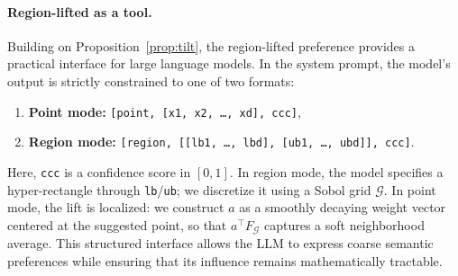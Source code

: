 \documentclass{article} %
\begin{document}


\paragraph{Region-lifted as a tool.}
Building on Proposition~\ref{prop:tilt}, the region-lifted preference provides a practical interface
for large language models.  
In the system prompt, the model’s output is strictly constrained to one of two formats:
\begin{enumerate}[label=\arabic*), leftmargin=*]
    \item \textbf{Point mode:} \texttt{[point, [x1, x2, \ldots, xd], ccc]},
    \item \textbf{Region mode:} \texttt{[region, [[lb1, \ldots, lbd], [ub1, \ldots, ubd]], ccc]}.
\end{enumerate}

Here, \texttt{ccc} is a confidence score in $[0,1]$.  
In region mode, the model specifies a hyper-rectangle through \texttt{lb}/\texttt{ub}; we discretize
it using a Sobol grid $\mathcal G$.
In point mode, the lift is localized: we construct $a$ as a smoothly decaying weight vector centered
at the suggested point, so that $a^\top F_{\mathcal G}$ captures a soft neighborhood average.
This structured interface allows the LLM to express coarse semantic preferences while ensuring that
its influence remains mathematically tractable.
\end{document}
